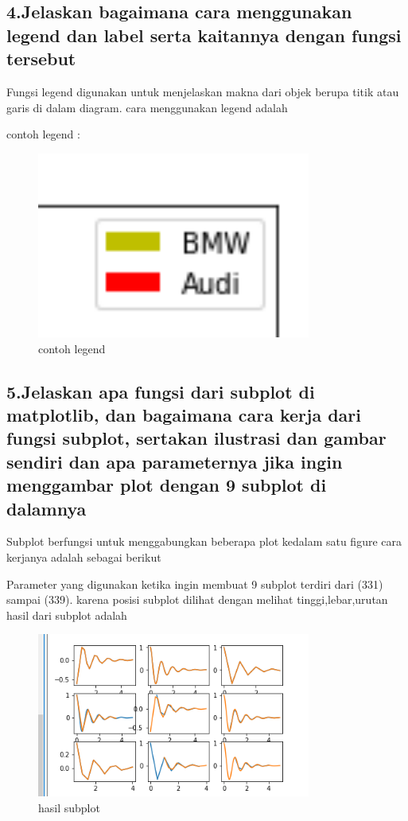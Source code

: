 \subsection{4.Jelaskan bagaimana cara menggunakan legend dan label serta kaitannya dengan fungsi tersebut}
Fungsi legend digunakan untuk menjelaskan makna dari objek berupa titik atau garis di dalam diagram.
cara menggunakan legend adalah 

contoh legend :
\begin{figure}[H]
\includegraphics[width=9cm]{figures/6/Teori/1174005/4legend.png}
\caption{contoh legend}
\centering
\end{figure}

\subsection{5.Jelaskan apa fungsi dari subplot di matplotlib, dan bagaimana cara kerja dari fungsi subplot, sertakan ilustrasi dan gambar sendiri dan apa parameternya jika ingin menggambar plot dengan 9 subplot di dalamnya}
Subplot berfungsi untuk menggabungkan beberapa plot kedalam satu figure
cara kerjanya adalah sebagai berikut

Parameter yang digunakan ketika ingin membuat 9 subplot terdiri dari (331) sampai (339). karena posisi subplot dilihat dengan melihat tinggi,lebar,urutan
hasil dari subplot adalah
\begin{figure}[H]
\includegraphics[width=9cm]{figures/6/Teori/1174005/5subplot.png}
\caption{hasil subplot}
\centering
\end{figure}

